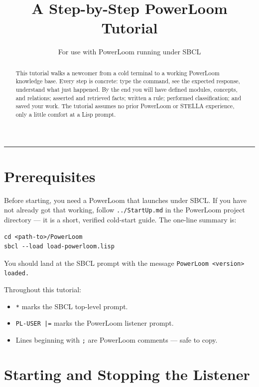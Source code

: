 \documentclass[11pt,letterpaper]{article}
\title{A Step-by-Step PowerLoom Tutorial}
\author{For use with PowerLoom running under SBCL}
\date{}
\newcommand{\cmd}[1]{\texttt{#1}}
\newcommand{\file}[1]{\texttt{#1}}
\newcommand{\prompt}[1]{\textcolor{plprompt}{\texttt{#1}}}
\begin{document}
\maketitle

\begin{abstract}
\noindent
This tutorial walks a newcomer from a cold terminal to a working PowerLoom
knowledge base. Every step is concrete: type the command, see the expected
response, understand what just happened. By the end you will have defined
modules, concepts, and relations; asserted and retrieved facts; written a
rule; performed classification; and saved your work. The tutorial assumes
no prior PowerLoom or STELLA experience, only a little comfort at a Lisp
prompt.
\end{abstract}

\tableofcontents
\bigskip\hrule

\section{Prerequisites}
\label{sec:prereqs}

Before starting, you need a PowerLoom that launches under SBCL. If you have
not already got that working, follow \file{../StartUp.md} in the PowerLoom
project directory --- it is a short, verified cold-start guide. The one-line
summary is:

\begin{lstlisting}[style=shell]
cd <path-to>/PowerLoom
sbcl --load load-powerloom.lisp
\end{lstlisting}

You should land at the SBCL prompt with the message
\cmd{PowerLoom <version> loaded.}

Throughout this tutorial:
\begin{itemize}[nosep]
  \item \prompt{*} marks the SBCL top-level prompt.
  \item \prompt{PL-USER |=} marks the PowerLoom listener prompt.
  \item Lines beginning with \cmd{;} are PowerLoom comments --- safe to copy.
\end{itemize}

\section{Starting and Stopping the Listener}
\label{sec:listener}
\end{document}
